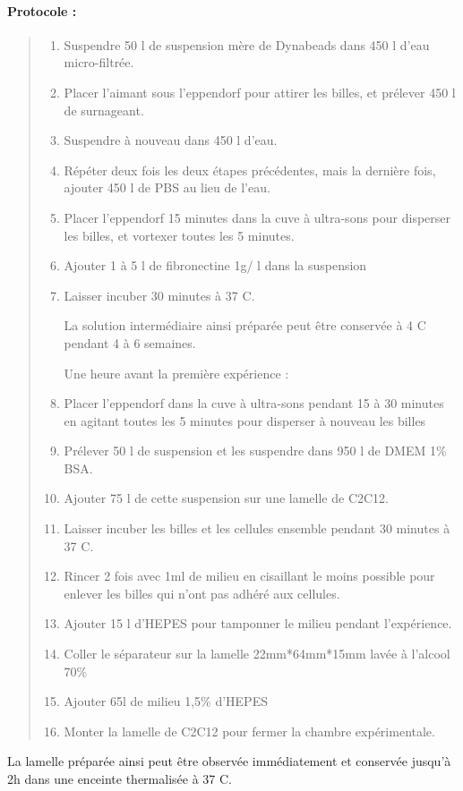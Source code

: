 	\paragraph{Protocole : }
	\begin{quote}
	\begin{enumerate}
	\item Suspendre 50 \micro l de suspension mère de Dynabeads dans 450  \micro l d'eau micro-filtrée. 
	\item Placer l'aimant sous l'eppendorf pour attirer les billes, et prélever 450 \micro l de surnageant.
	\item Suspendre à nouveau dans 450 \micro l d'eau.
	\item Répéter deux fois les deux étapes précédentes, mais la dernière fois, ajouter 450 \micro l de PBS au lieu de l'eau. 
	\item Placer l'eppendorf 15 minutes dans la cuve à ultra-sons pour disperser les billes, et vortexer toutes les 5 minutes.
	\item Ajouter 1 à 5 \micro l de fibronectine 1\micro g/ \micro l  dans la suspension
	\item Laisser incuber 30 minutes à 37 \degres C. 

La solution intermédiaire ainsi préparée peut être conservée à 4 \degres C pendant 4 à 6 semaines. 

Une heure avant la première expérience : 
	\item Placer l'eppendorf dans la cuve à ultra-sons pendant 15 à 30 minutes en agitant toutes les 5 minutes pour disperser à nouveau les billes
	\item Prélever 50 \micro l de suspension et les suspendre dans 950 \micro l de DMEM 1\% BSA. 
	\item Ajouter 75 \micro l de cette suspension sur une lamelle de C2C12.
	\item Laisser incuber les billes et les cellules ensemble pendant 30 minutes à 37 \degres C. 
	\item Rincer 2 fois avec 1ml de milieu en cisaillant le moins possible pour enlever les billes qui n'ont pas adhéré aux cellules. 
	\item Ajouter 15 \micro l d'HEPES pour tamponner le milieu pendant l'expérience.
	\item Coller le séparateur sur la lamelle 22mm*64mm*15mm lavée à l'alcool 70\%
	\item Ajouter 65\micro l de milieu 1,5\% d'HEPES
	\item Monter la lamelle de C2C12 pour fermer la chambre expérimentale.  
 
	\end{enumerate}
	\end{quote}
La lamelle préparée ainsi peut être observée immédiatement et conservée jusqu'à 2h dans une enceinte thermalisée à 37 \degres C. 	 	
	
